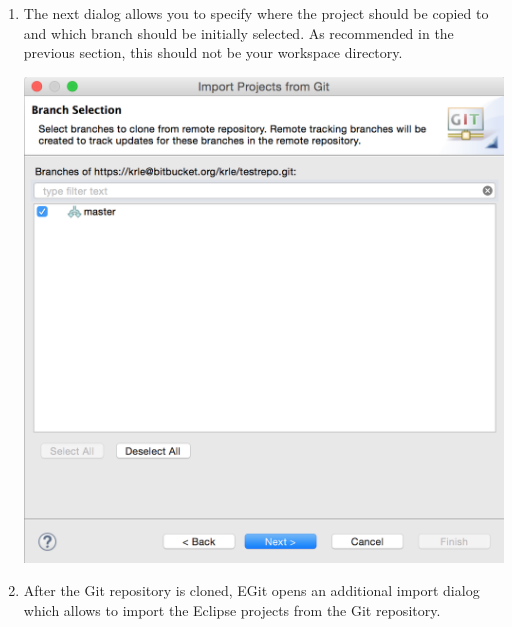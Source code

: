 \documentclass{article}
\begin{document}
\begin{enumerate}
\item The next dialog allows you to specify where the project should
  be copied to and which branch should be initially selected. As
  recommended in the previous section, this should not be your
  workspace directory.

\begin{center}
\includegraphics[scale=0.35]{figures/s16.png}
\end{center}

\item After the Git repository is cloned, EGit opens an additional import dialog which allows to import the Eclipse projects from the Git repository.


\end{enumerate}
\end{document}
